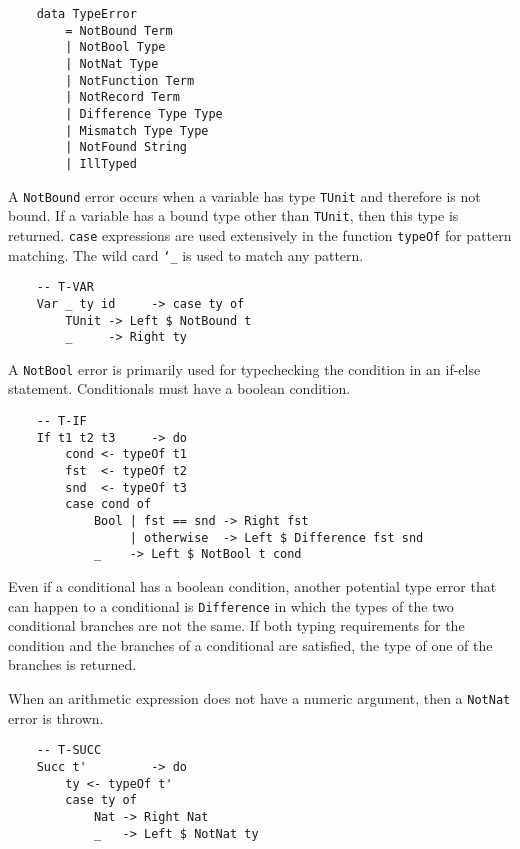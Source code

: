\documentclass[fleqn, 11pt]{article}
\begin{document}
\begin{Verbatim}
    data TypeError 
        = NotBound Term 
        | NotBool Type
        | NotNat Type
        | NotFunction Term
        | NotRecord Term
        | Difference Type Type
        | Mismatch Type Type
        | NotFound String 
        | IllTyped
\end{Verbatim}

A \texttt{NotBound} error occurs when a variable has type \texttt{TUnit} and therefore is not bound. If a variable has a bound type other 
than \texttt{TUnit}, then this type is returned. \texttt{case} expressions are used extensively in the function 
\texttt{typeOf} for pattern matching. The wild card \texttt{\char`_} is used to match any pattern.

\begin{Verbatim}
    -- T-VAR
    Var _ ty id     -> case ty of                           
        TUnit -> Left $ NotBound t   
        _     -> Right ty
\end{Verbatim}

A \texttt{NotBool} error is primarily used for typechecking the condition in an if-else statement. Conditionals must have a boolean condition.

\begin{Verbatim}
    -- T-IF
    If t1 t2 t3     -> do                                       
        cond <- typeOf t1 
        fst  <- typeOf t2 
        snd  <- typeOf t3 
        case cond of 
            Bool | fst == snd -> Right fst 
                 | otherwise  -> Left $ Difference fst snd
            _    -> Left $ NotBool t cond           
\end{Verbatim}

Even if a conditional has a boolean condition, another potential type error that can happen to a conditional is \texttt{Difference} in which 
the types of the two conditional branches are not the same. If both typing requirements for the condition and the branches of a conditional 
are satisfied, the type of one of the branches is returned.

When an arithmetic expression does not have a numeric argument, then a \texttt{NotNat} error is thrown. 

\begin{Verbatim}
    -- T-SUCC
    Succ t'         -> do                                     
        ty <- typeOf t' 
        case ty of  
            Nat -> Right Nat
            _   -> Left $ NotNat ty          
\end{Verbatim}
\end{document}
